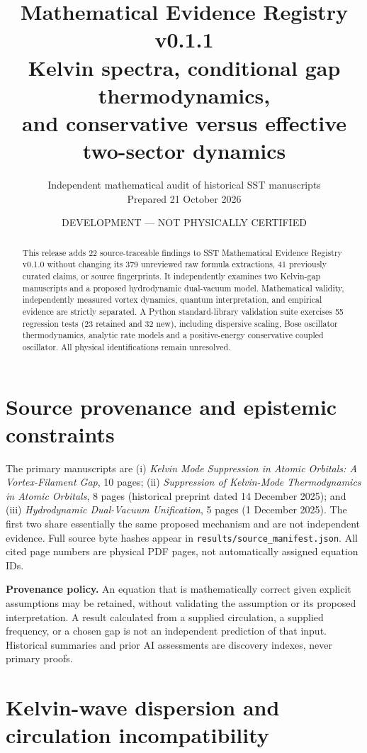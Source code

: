 \documentclass[10pt,a4paper]{article}
\title{\textbf{Mathematical Evidence Registry v0.1.1}\\
\large Kelvin spectra, conditional gap thermodynamics,\\ and conservative versus effective two-sector dynamics}
\author{Independent mathematical audit of historical SST manuscripts\\\small Prepared 21 October 2026}
\date{DEVELOPMENT --- NOT PHYSICALLY CERTIFIED}
\begin{document}
\maketitle
\begin{abstract}
This release adds 22 source-traceable findings to SST Mathematical Evidence Registry v0.1.0 without changing its 379 unreviewed raw formula extractions, 41 previously curated claims, or source fingerprints. It independently examines two Kelvin-gap manuscripts and a proposed hydrodynamic dual-vacuum model. Mathematical validity, independently measured vortex dynamics, quantum interpretation, and empirical evidence are strictly separated. A Python standard-library validation suite exercises 55 regression tests (23 retained and 32 new), including dispersive scaling, Bose oscillator thermodynamics, analytic rate models and a positive-energy conservative coupled oscillator. All physical identifications remain unresolved.
\end{abstract}
\tableofcontents
\section{Source provenance and epistemic constraints}
The primary manuscripts are (i) \emph{Kelvin Mode Suppression in Atomic Orbitals: A Vortex-Filament Gap}, 10 pages; (ii) \emph{Suppression of Kelvin-Mode Thermodynamics in Atomic Orbitals}, 8 pages (historical preprint dated 14 December 2025); and (iii) \emph{Hydrodynamic Dual-Vacuum Unification}, 5 pages (1 December 2025). The first two share essentially the same proposed mechanism and are not independent evidence. Full source byte hashes appear in \texttt{results/source\_manifest.json}. All cited page numbers are physical PDF pages, not automatically assigned equation IDs.

\textbf{Provenance policy.} An equation that is mathematically correct given explicit assumptions may be retained, without validating the assumption or its proposed interpretation. A result calculated from a supplied circulation, a supplied frequency, or a chosen gap is not an independent prediction of that input. Historical summaries and prior AI assessments are discovery indexes, never primary proofs.

\section{Kelvin-wave dispersion and circulation incompatibility}
\end{document}
